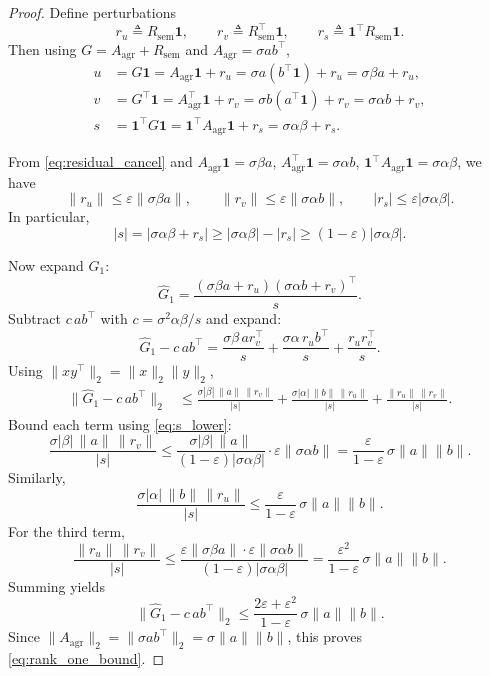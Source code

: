 \begin{proof}
Define perturbations
\[
r_u \triangleq R_{\mathrm{sem}}\mathbf{1},\qquad
r_v \triangleq R_{\mathrm{sem}}^\top\mathbf{1},\qquad
r_s \triangleq \mathbf{1}^\top R_{\mathrm{sem}}\mathbf{1}.
\]
Then using $G=A_{\mathrm{agr}}+R_{\mathrm{sem}}$ and $A_{\mathrm{agr}}=\sigma ab^\top$,
\begin{align*}
u &= G\mathbf{1} = A_{\mathrm{agr}}\mathbf{1} + r_u
= \sigma a(b^\top\mathbf{1}) + r_u
= \sigma\beta a + r_u,\\
v &= G^\top\mathbf{1} = A_{\mathrm{agr}}^\top\mathbf{1} + r_v
= \sigma b(a^\top\mathbf{1}) + r_v
= \sigma\alpha b + r_v,\\
s &= \mathbf{1}^\top G\mathbf{1}
= \mathbf{1}^\top A_{\mathrm{agr}}\mathbf{1} + r_s
= \sigma\alpha\beta + r_s.
\end{align*}

From \eqref{eq:residual_cancel} and $A_{\mathrm{agr}}\mathbf{1}=\sigma\beta a$,
$A_{\mathrm{agr}}^\top\mathbf{1}=\sigma\alpha b$, $\mathbf{1}^\top A_{\mathrm{agr}}\mathbf{1}=\sigma\alpha\beta$,
we have
\[
\|r_u\|\le \varepsilon \|\sigma\beta a\|,
\qquad
\|r_v\|\le \varepsilon \|\sigma\alpha b\|,
\qquad
|r_s|\le \varepsilon |\sigma\alpha\beta|.
\]
In particular,
\begin{equation}
\label{eq:s_lower}
|s|
=
|\sigma\alpha\beta + r_s|
\ge
|\sigma\alpha\beta| - |r_s|
\ge
(1-\varepsilon)|\sigma\alpha\beta|.
\end{equation}

Now expand $\widehat{G}_1$:
\[
\widehat{G}_1
=
\frac{(\sigma\beta a + r_u)(\sigma\alpha b + r_v)^\top}{s}.
\]
Subtract $c\,ab^\top$ with $c=\sigma^2\alpha\beta/s$ and expand:
\[
\widehat{G}_1 - c\,ab^\top
=
\frac{\sigma\beta\, a r_v^\top}{s}
+
\frac{\sigma\alpha\, r_u b^\top}{s}
+
\frac{r_u r_v^\top}{s}.
\]
Using $\|xy^\top\|_2=\|x\|_2\|y\|_2$,
\begin{align*}
\|\widehat{G}_1 - c\,ab^\top\|_2
&\le
\frac{\sigma|\beta|\,\|a\|\,\|r_v\|}{|s|}
+
\frac{\sigma|\alpha|\,\|b\|\,\|r_u\|}{|s|}
+
\frac{\|r_u\|\,\|r_v\|}{|s|}.
\end{align*}
Bound each term using \eqref{eq:s_lower}:
\[
\frac{\sigma|\beta|\,\|a\|\,\|r_v\|}{|s|}
\le
\frac{\sigma|\beta|\,\|a\|}{(1-\varepsilon)|\sigma\alpha\beta|}
\cdot
\varepsilon\|\sigma\alpha b\|
=
\frac{\varepsilon}{1-\varepsilon}\,\sigma\|a\|\|b\|.
\]
Similarly,
\[
\frac{\sigma|\alpha|\,\|b\|\,\|r_u\|}{|s|}
\le
\frac{\varepsilon}{1-\varepsilon}\,\sigma\|a\|\|b\|.
\]
For the third term,
\[
\frac{\|r_u\|\,\|r_v\|}{|s|}
\le
\frac{\varepsilon\|\sigma\beta a\|\cdot \varepsilon\|\sigma\alpha b\|}{(1-\varepsilon)|\sigma\alpha\beta|}
=
\frac{\varepsilon^2}{1-\varepsilon}\,\sigma\|a\|\|b\|.
\]
Summing yields
\[
\|\widehat{G}_1 - c\,ab^\top\|_2
\le
\frac{2\varepsilon+\varepsilon^2}{1-\varepsilon}\,\sigma\|a\|\|b\|.
\]
Since $\|A_{\mathrm{agr}}\|_2=\|\sigma ab^\top\|_2=\sigma\|a\|\|b\|$, this proves \eqref{eq:rank_one_bound}.


\end{proof}
